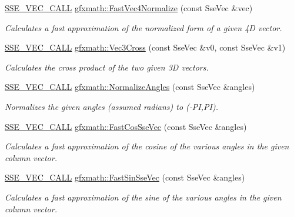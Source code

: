 \begin{DoxyCompactItemize}
\hyperlink{ssevec__math__defs_8h_a97454f977a5281455cecacce1e8ba670}{S\+S\+E\+\_\+\+V\+E\+C\+\_\+\+C\+A\+L\+L} \hyperlink{group___s_i_m_d_vec_math_ga1c5d655ff8dfaebe8e8c99300a72dcfc}{gfxmath\+::\+Fast\+Vec4\+Normalize} (const Sse\+Vec \&vec)
\begin{DoxyCompactList}\small\item\em Calculates a fast approximation of the normalized form of a given 4\+D vector. \end{DoxyCompactList}\item 
\hyperlink{ssevec__math__defs_8h_a97454f977a5281455cecacce1e8ba670}{S\+S\+E\+\_\+\+V\+E\+C\+\_\+\+C\+A\+L\+L} \hyperlink{group___s_i_m_d_vec_math_ga69d9cb2d8b73743a44bdbd04ed2948bf}{gfxmath\+::\+Vec3\+Cross} (const Sse\+Vec \&v0, const Sse\+Vec \&v1)
\begin{DoxyCompactList}\small\item\em Calculates the cross product of the two given 3\+D vectors. \end{DoxyCompactList}\item 
\hyperlink{ssevec__math__defs_8h_a97454f977a5281455cecacce1e8ba670}{S\+S\+E\+\_\+\+V\+E\+C\+\_\+\+C\+A\+L\+L} \hyperlink{group___s_i_m_d_vec_math_ga23869cd4461571a7546b726f0964d1fc}{gfxmath\+::\+Normalize\+Angles} (const Sse\+Vec \&angles)
\begin{DoxyCompactList}\small\item\em Normalizes the given angles (assumed radians) to (-\/\+P\+I,P\+I). \end{DoxyCompactList}\item 
\hyperlink{ssevec__math__defs_8h_a97454f977a5281455cecacce1e8ba670}{S\+S\+E\+\_\+\+V\+E\+C\+\_\+\+C\+A\+L\+L} \hyperlink{group___s_i_m_d_vec_math_ga9805d851a980ead20c3c7354c6273b6c}{gfxmath\+::\+Fast\+Cos\+Sse\+Vec} (const Sse\+Vec \&angles)
\begin{DoxyCompactList}\small\item\em Calculates a fast approximation of the cosine of the various angles in the given column vector. \end{DoxyCompactList}\item 
\hyperlink{ssevec__math__defs_8h_a97454f977a5281455cecacce1e8ba670}{S\+S\+E\+\_\+\+V\+E\+C\+\_\+\+C\+A\+L\+L} \hyperlink{group___s_i_m_d_vec_math_ga78af7175bfbeef26471a5252fba86949}{gfxmath\+::\+Fast\+Sin\+Sse\+Vec} (const Sse\+Vec \&angles)
\begin{DoxyCompactList}\small\item\em Calculates a fast approximation of the sine of the various angles in the given column vector. \end{DoxyCompactList}\item 

\end{DoxyCompactItemize}
